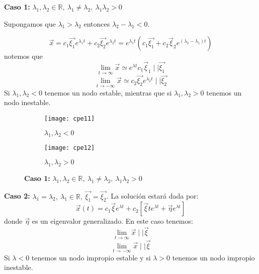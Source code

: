 \textbf{Caso 1:} $\lambda_1, \lambda_2 \in \mathbb{R}, \ \lambda_1 \neq \lambda_2, \ \lambda_1\lambda_2 >0$

Supongamos que $\lambda_1 > \lambda_2$ entonces $\lambda_2 - \lambda_1 <0$.

$$
\vec{x}= c_1 \vec{\xi_1} e^{\lambda_1 t} + c_2\vec{\xi_2}e^{\lambda_2 t} = e^{\lambda_1 t} \left( c_1\vec{\xi_1} + c_2\vec{\xi}_2 e^{(\lambda_2 - \lambda_1)t} \right) 
$$
notemos que
$$
\lim_{t \to \infty} \vec{x} \simeq e^{\lambda t}c_1\vec{\xi}_1  \mid   \mid  \vec{\xi_1}  
$$
$$
\lim_{t \to -\infty} \vec{x} \simeq c_2\vec{\xi_2} e^{\lambda_2 t}  \mid  \mid \vec{\xi_2} 
$$
Si $\lambda_1, \lambda_2<0$ tenemos un nodo estable, mientras que si $\lambda_1, \lambda_2>0$ tenemos un nodo inestable.

\begin{figure}[!tbp]
  \begin{subfigure}[b]{0.49\textwidth}
    \texttt{[image: cpe11]}
    \caption{$\lambda_1,\lambda_2<0$}
  \end{subfigure}
  \hfill
  \begin{subfigure}[b]{0.49\textwidth}
    \texttt{[image: cpe12]}
    \caption{$\lambda_1,\lambda_2>0$}
  \end{subfigure}
  \caption{\textbf{Caso 1:} $\lambda_1, \lambda_2 \in \mathbb{R}, \ \lambda_1 \neq \lambda_2, \ \lambda_1\lambda_2 >0$}
\end{figure}

\textbf{Caso 2:} $\lambda_1 = \lambda_2, \ \lambda_1 \in \mathbb{R} , \ \vec{\xi_1}= \vec{\xi_2}$. La solución estará dada por:
$$
\vec{x}(t) = c_1 \vec{\xi} e^{\lambda t} + c_2 \left[ \vec{\xi}te^{\lambda t} + \vec{\eta}e^{\lambda t} \right] 
$$
donde $\vec{\eta}$ es un eigenvalor generalizado. En este caso tenemos:
$$
\lim_{t \to \infty} \vec{x}  \mid   \mid \vec{\xi}
$$
 $$
\lim_{t \to -\infty} \vec{x}  \mid   \mid \vec{\xi} 
$$
Si $\lambda<0$ tenemos un nodo impropio estable y si $\lambda>0$ tenemos un nodo impropio inestable.

